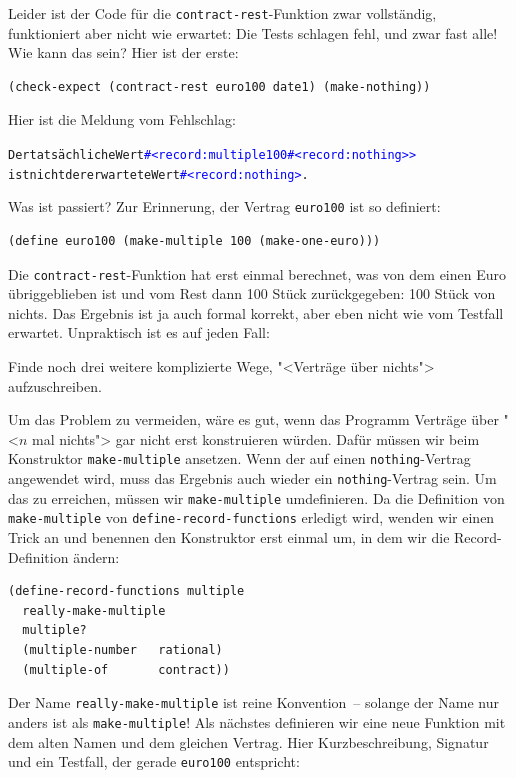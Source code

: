 Leider ist der Code für die \lstinline{contract-rest}-Funktion zwar
vollständig, funktioniert aber nicht wie erwartet: Die Tests schlagen
fehl, und zwar fast alle!  Wie kann das sein?  Hier ist
der erste:
%
\begin{lstlisting}
(check-expect (contract-rest euro100 date1) (make-nothing))
\end{lstlisting}
%
Hier ist die Meldung vom Fehlschlag:
%
\begin{alltt}
Der tatsächliche Wert \textcolor{blue}{#<record:multiple 100 #<record:nothing>>}
ist nicht der erwartete Wert \textcolor{blue}{#<record:nothing>}.
\end{alltt}
%
Was ist passiert?  Zur Erinnerung, der Vertrag \lstinline{euro100} ist
so definiert:
%
\begin{lstlisting}
(define euro100 (make-multiple 100 (make-one-euro))) 
\end{lstlisting}
%
Die \lstinline{contract-rest}-Funktion hat erst einmal berechnet, was
von dem einen Euro übriggeblieben ist und vom Rest dann 100 Stück
zurückgegeben: 100 Stück von nichts.  Das Ergebnis ist ja auch
formal korrekt, aber eben nicht wie vom Testfall erwartet.
Unpraktisch ist es auf jeden Fall:
%
\begin{aufgabeinline}
  Finde noch drei weitere komplizierte Wege, "<Verträge über nichts">
  aufzuschreiben.
\end{aufgabeinline}
%
Um das Problem zu vermeiden, wäre es gut, wenn das Programm Verträge
über "<$n$ mal nichts"> gar nicht erst konstruieren würden.  Dafür
müssen wir beim Konstruktor \lstinline{make-multiple} ansetzen.  Wenn
der auf einen \lstinline{nothing}-Vertrag angewendet wird, muss das
Ergebnis auch wieder ein \lstinline{nothing}-Vertrag sein.  Um das zu
erreichen, müssen wir \lstinline{make-multiple} umdefinieren.  Da die
Definition von \lstinline{make-multiple} von
\lstinline{define-record-functions} erledigt wird, wenden wir einen
Trick an und benennen den Konstruktor erst einmal um, in dem wir die
Record-Definition ändern:
%
\begin{lstlisting}
(define-record-functions multiple
  really-make-multiple
  multiple?
  (multiple-number   rational)
  (multiple-of       contract))
\end{lstlisting}
%
Der Name \lstinline{really-make-multiple} ist reine Konvention~--
solange der Name nur anders ist als \lstinline{make-multiple}!  Als
nächstes definieren wir eine neue Funktion mit dem alten Namen und dem
gleichen Vertrag.  Hier Kurzbeschreibung, Signatur und ein Testfall,
der gerade \lstinline{euro100} entspricht:

